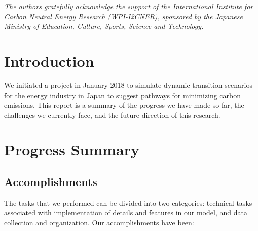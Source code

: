 \documentclass[14pt,a4paper]{article} %
\begin{document}
\begin{titlepage}

    \textit{The authors gratefully acknowledge the support of the International Institute for Carbon
Neutral Energy Research (WPI-I2CNER), sponsored by the Japanese Ministry of Education, Culture, Sports, Science and Technology.}  

\end{titlepage}

\section{Introduction}
We initiated a project in January 2018 to simulate dynamic transition scenarios for the energy industry in Japan to suggest pathways for minimizing carbon emissions. This report is a summary of the progress we have made so far, the challenges we currently face, and the future direction of this research. 

\section{Progress Summary}

\subsection{Accomplishments}

The tasks that we performed can be divided into two categories: technical tasks associated with implementation of details and features in our model, and data collection and organization. Our accomplishments have been:
\end{document}

